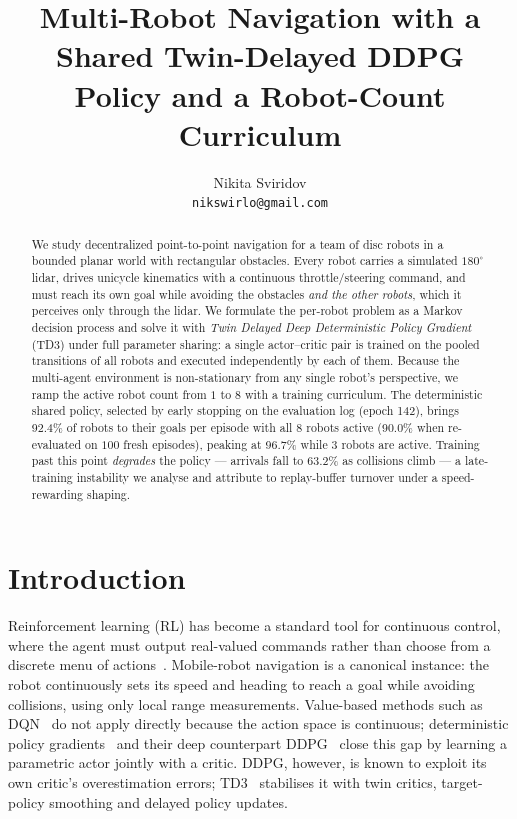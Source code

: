 \documentclass[11pt,a4paper]{article}
\title{\vspace{-1.2cm}\bfseries Multi-Robot Navigation with a Shared
Twin-Delayed DDPG Policy and a Robot-Count Curriculum}
\author{Nikita Sviridov\\\small\texttt{nikswirlo@gmail.com}}
\date{}
\newcommand{\CurriculumCap}{8}
\newcommand{\LateArrived}{63.2\%}
\newcommand{\BestArrived}{92.4\%}
\newcommand{\BestEpoch}{142}
\newcommand{\PeakArrived}{96.7\%}
\newcommand{\PeakRobots}{3}
\newcommand{\FreshArrived}{90.0\%}
\begin{document}
\maketitle

\begin{abstract}
\noindent
We study decentralized point-to-point navigation for a team of disc robots in
a bounded planar world with rectangular obstacles. Every robot carries a
simulated $180^\circ$ lidar, drives unicycle kinematics with a continuous
throttle/steering command, and must reach its own goal while avoiding the
obstacles \emph{and the other robots}, which it perceives only through the
lidar. We formulate the per-robot problem as a Markov decision process and
solve it with \emph{Twin Delayed Deep Deterministic Policy Gradient} (TD3)
under full parameter sharing: a single actor--critic pair is trained on the
pooled transitions of all robots and executed independently by each of them.
Because the multi-agent environment is non-stationary from any single robot's
perspective, we ramp the active robot count from $1$ to \CurriculumCap{} with
a training curriculum. The deterministic shared policy, selected by early
stopping on the evaluation log (epoch \BestEpoch), brings \BestArrived{} of
robots to their goals per episode with all \CurriculumCap{} robots active
(\FreshArrived{} when re-evaluated on $100$ fresh episodes), peaking at
\PeakArrived{} while \PeakRobots{} robots are active. Training past this
point \emph{degrades} the policy — arrivals fall to \LateArrived{} as
collisions climb — a late-training instability we analyse and attribute to
replay-buffer turnover under a speed-rewarding shaping.
\end{abstract}

\section{Introduction}
Reinforcement learning (RL) has become a standard tool for continuous
control, where the agent must output real-valued commands rather than choose
from a discrete menu of actions~\cite{sutton2018}. Mobile-robot navigation is
a canonical instance: the robot continuously sets its speed and heading to
reach a goal while avoiding collisions, using only local range measurements.
Value-based methods such as DQN~\cite{mnih2015} do not apply directly because
the action space is continuous; deterministic policy
gradients~\cite{silver2014} and their deep counterpart
DDPG~\cite{lillicrap2016} close this gap by learning a parametric actor
jointly with a critic. DDPG, however, is known to exploit its own critic's
overestimation errors; TD3~\cite{fujimoto2018} stabilises it with twin
critics, target-policy smoothing and delayed policy updates.
\end{document}
